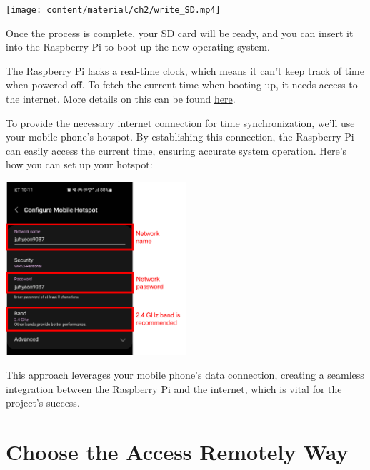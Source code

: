 \documentclass[
  letterpaper,
]{scrbook}
\begin{document}
\texttt{[image: content/material/ch2/write\_SD.mp4]}

Once the process is complete, your SD card will be ready, and you can
insert it into the Raspberry Pi to boot up the new operating system.

\begin{tcolorbox}[enhanced jigsaw, bottomrule=.15mm, opacitybacktitle=0.6, toprule=.15mm, colback=white, colbacktitle=quarto-callout-note-color!10!white, left=2mm, colframe=quarto-callout-note-color-frame, coltitle=black, title=\textcolor{quarto-callout-note-color}{\faInfo}\hspace{0.5em}{Why Do We Use Our Mobile Hotspot for This Project?}, opacityback=0, breakable, bottomtitle=1mm, toptitle=1mm, titlerule=0mm, arc=.35mm, leftrule=.75mm, rightrule=.15mm]

The Raspberry Pi lacks a real-time clock, which means it can't keep
track of time when powered off. To fetch the current time when booting
up, it needs access to the internet. More details on this can be found
\href{https://dayne.broderson.org/2020/03/12/the_time_is_now.html}{here}.

To provide the necessary internet connection for time synchronization,
we'll use your mobile phone's hotspot. By establishing this connection,
the Raspberry Pi can easily access the current time, ensuring accurate
system operation. Here's how you can set up your hotspot:

\includegraphics[width=0.5\textwidth,height=\textheight]{content/material/ch2/mobile_hotspot.png}

This approach leverages your mobile phone's data connection, creating a
seamless integration between the Raspberry Pi and the internet, which is
vital for the project's success.

\end{tcolorbox}

\hypertarget{choose-the-access-remotely-way}{%
\section{Choose the Access Remotely
Way}\label{choose-the-access-remotely-way}}
\end{document}
